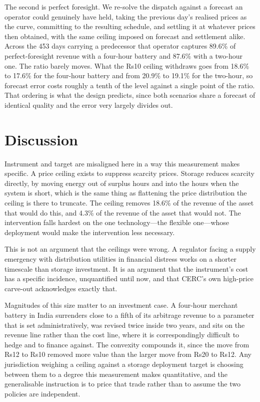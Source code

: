 \documentclass[conference,a4paper]{IEEEtran}
\begin{document}
The second is perfect foresight. We re-solve the dispatch against a forecast an
operator could genuinely have held, taking the previous day's realised prices as
the curve, committing to the resulting schedule, and settling it at whatever
prices then obtained, with the same ceiling imposed on forecast and settlement
alike. Across the 453 days carrying a predecessor that operator captures 89.6\%
of perfect-foresight revenue with a four-hour battery and 87.6\% with a two-hour
one. The ratio barely moves. What the Rs10 ceiling withdraws goes from 18.6\% to
17.6\% for the four-hour battery and from 20.9\% to 19.1\% for the two-hour, so
forecast error costs roughly a tenth of the level against a single point of the
ratio. That ordering is what the design predicts, since both scenarios share a
forecast of identical quality and the error very largely divides out.

\section{Discussion}

Instrument and target are misaligned here in a way this measurement makes
specific. A price ceiling exists to suppress scarcity prices. Storage reduces
scarcity directly, by moving energy out of surplus hours and into the hours when
the system is short, which is the same thing as flattening the price
distribution the ceiling is there to truncate. The ceiling removes 18.6\% of the
revenue of the asset that would do this, and 4.3\% of the revenue of the asset
that would not. The intervention falls hardest on the one technology---the
flexible one---whose deployment would make the intervention less necessary.

This is not an argument that the ceilings were wrong. A regulator facing a
supply emergency with distribution utilities in financial distress works on a
shorter timescale than storage investment. It is an argument that the
instrument's cost has a specific incidence, unquantified until now, and that
CERC's own high-price carve-out acknowledges exactly that.

Magnitudes of this size matter to an investment case. A four-hour merchant
battery in India surrenders close to a fifth of its arbitrage revenue to a
parameter that is set administratively, was revised twice inside two years, and
sits on the revenue line rather than the cost line, where it is correspondingly
difficult to hedge and to finance against. The convexity compounds it, since the
move from Rs12 to Rs10 removed more value than the larger move from Rs20 to
Rs12. Any jurisdiction weighing a ceiling against a storage deployment target is
choosing between them to a degree this measurement makes quantitative, and the
generalisable instruction is to price that trade rather than to assume the two
policies are independent.
\end{document}
